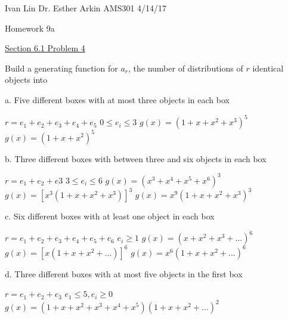 \documentclass{article}
\begin{document}
Ivan Lin\newline{}
Dr. Esther Arkin\newline{}
AMS301\newline{}
4/14/17

\begin{center}
  Homework 9a
\end{center}

\underline{Section 6.1 Problem 4}\newline{}

Build a generating function for $a_r$, the number of distributions of $r$ identical objects into \newline{}

a. Five different boxes with at most three objects in each box

$r=e_1+e_2+e_3+e_4+e_5$\newline{}
$0 \leq e_i\leq 3$\newline{}
$g(x)=(1+x+x^2+x^3)^5$\newline{}
$g(x)=(1+x+x^2)^5$\newline{}

b. Three different boxes with between three and six objects in each box\newline{}

$r=e_1+e_2+e3$\newline{}
$3 \leq e_i \leq 6$\newline{}
$g(x)=(x^3+x^4+x^5+x^6)^3$\newline{}
$g(x)=[x^3(1+x+x^2+x^3)]^3$\newline{}
$g(x)=x^9(1+x+x^2+x^3)^3$\newline{}

c. Six different boxes with at least one object in each box\newline{}

$r=e_1+e_2+e_3+e_4+e_5+e_6$\newline{}
$e_i \geq 1$\newline{}
$g(x)=(x+x^2+x^3+...)^6$\newline{}
$g(x)=[x(1+x+x^2+...)]^6$\newline{}
$g(x)=x^6(1+x+x^2+...)^6$\newline{}

d. Three different boxes with at most five objects in the first box\newline{}

$r=e_1+e_2+e_3$\newline{}
$e_1\leq 5, e_i \geq 0$\newline{}
$g(x)=(1+x+x^2+x^3+x^4+x^5)(1+x+x^2+...)^2$\newline{}
\end{document}
